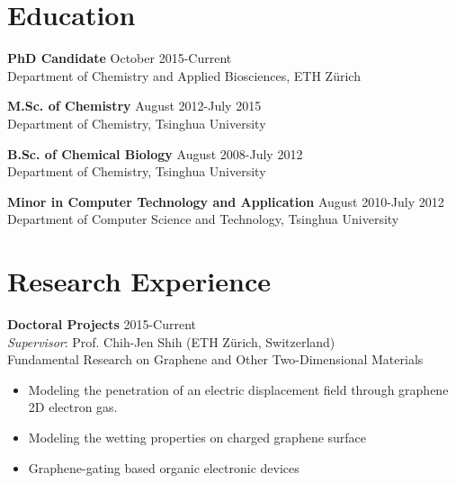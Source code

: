 \documentclass[margin]{res}
\begin{document}


\address{ HCI D120 \\
          Vladimir-Prelog-Weg 1/5 \\
          ETH Z\"{u}rich, CH-8093, Z\"{u}rich, Switzerland \\
          +41-44-63-37330 \\
          Mail: tian.tian@chem.ethz.ch}
\address{{} \\  \\  \\
        }

\begin{resume}


\section{Education}

\textbf{PhD Candidate} \hfill October 2015-Current\\
Department of Chemistry and Applied Biosciences, ETH Z\"{u}rich

\textbf{M.Sc. of Chemistry}  \hfill August 2012-July 2015\\
Department of Chemistry, Tsinghua University

\textbf{B.Sc. of Chemical Biology}  \hfill August 2008-July 2012\\
Department of Chemistry, Tsinghua University

\textbf{Minor in Computer Technology and Application}  \hfill August 2010-July 2012\\
Department of Computer Science and Technology, Tsinghua University

\section{Research Experience}
\textbf{Doctoral Projects} \hfill 2015-Current\\
\textit{Supervisor}: Prof. Chih-Jen Shih (ETH Z\"{u}rich, Switzerland)\\
Fundamental Research on Graphene and Other Two-Dimensional Materials
\begin{itemize} \itemsep -2pt
  \item Modeling the penetration of an electric displacement field through graphene 2D electron gas.
  \item Modeling the wetting properties on charged graphene surface
  \item Graphene-gating based organic electronic devices
\end{itemize}


\end{resume}
\end{document}
